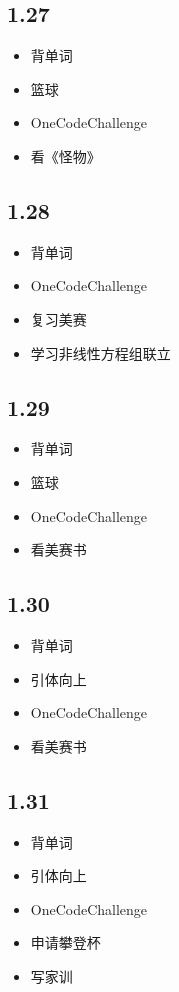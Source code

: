 \documentclass[UTF8]{ctexart}
\begin{document}
\subsection*{1.27}
\begin{itemize}
    \item 背单词
    \item 篮球
    \item OneCodeChallenge
    \item 看《怪物》
\end{itemize}

\subsection*{1.28}
\begin{itemize}
    \item 背单词
    \item OneCodeChallenge
    \item 复习美赛
    \item 学习非线性方程组联立
\end{itemize}

\subsection*{1.29}
\begin{itemize}
    \item 背单词
    \item 篮球
    \item OneCodeChallenge
    \item 看美赛书
\end{itemize}

\subsection*{1.30}
\begin{itemize}
    \item 背单词
    \item 引体向上
    \item OneCodeChallenge
    \item 看美赛书
\end{itemize}

\subsection*{1.31}
\begin{itemize}
    \item 背单词
    \item 引体向上
    \item OneCodeChallenge
    \item 申请攀登杯
    \item 写家训
\end{itemize}
\end{document}
